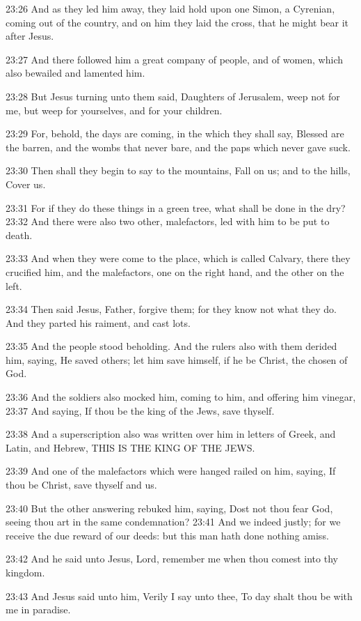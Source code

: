 23:26 And as they led him away, they laid hold upon one Simon, a Cyrenian, coming out of the country, and on him they laid the cross, that he might bear it after Jesus.

23:27 And there followed him a great company of people, and of women, which also bewailed and lamented him.

23:28 But Jesus turning unto them said, Daughters of Jerusalem, weep not for me, but weep for yourselves, and for your children.

23:29 For, behold, the days are coming, in the which they shall say, Blessed are the barren, and the wombs that never bare, and the paps which never gave suck.

23:30 Then shall they begin to say to the mountains, Fall on us; and to the hills, Cover us.

23:31 For if they do these things in a green tree, what shall be done in the dry?  23:32 And there were also two other, malefactors, led with him to be put to death.

23:33 And when they were come to the place, which is called Calvary, there they crucified him, and the malefactors, one on the right hand, and the other on the left.

23:34 Then said Jesus, Father, forgive them; for they know not what they do. And they parted his raiment, and cast lots.

23:35 And the people stood beholding. And the rulers also with them derided him, saying, He saved others; let him save himself, if he be Christ, the chosen of God.

23:36 And the soldiers also mocked him, coming to him, and offering him vinegar, 23:37 And saying, If thou be the king of the Jews, save thyself.

23:38 And a superscription also was written over him in letters of Greek, and Latin, and Hebrew, THIS IS THE KING OF THE JEWS.

23:39 And one of the malefactors which were hanged railed on him, saying, If thou be Christ, save thyself and us.

23:40 But the other answering rebuked him, saying, Dost not thou fear God, seeing thou art in the same condemnation?  23:41 And we indeed justly; for we receive the due reward of our deeds: but this man hath done nothing amiss.

23:42 And he said unto Jesus, Lord, remember me when thou comest into thy kingdom.

23:43 And Jesus said unto him, Verily I say unto thee, To day shalt thou be with me in paradise.

